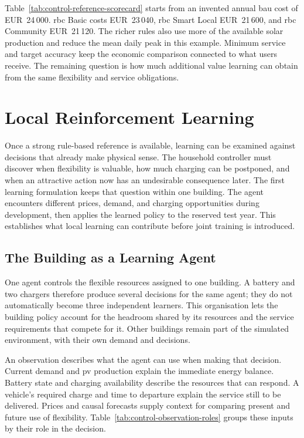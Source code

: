 

\illustrativereading Table~\ref{tab:control-reference-scorecard} starts from an invented annual \gls{bau} cost of EUR~24\,000. \gls{rbc} Basic costs EUR~23\,040, \gls{rbc} Smart Local EUR~21\,600, and \gls{rbc} Community EUR~21\,120. The richer rules also use more of the available solar production and reduce the mean daily peak in this example. Minimum service and target accuracy keep the economic comparison connected to what users receive. The remaining question is how much additional value learning can obtain from the same flexibility and service obligations.


\section{Local Reinforcement Learning}
\label{sec:control-local-learning}
\label{sec:single-agent-learning}

Once a strong rule-based reference is available, learning can be examined against decisions that already make physical sense. The household controller must discover when flexibility is valuable, how much charging can be postponed, and when an attractive action now has an undesirable consequence later. The first learning formulation keeps that question within one building. The agent encounters different prices, demand, and charging opportunities during development, then applies the learned policy to the reserved test year. This establishes what local learning can contribute before joint training is introduced.

\subsection{The Building as a Learning Agent}

One agent controls the flexible resources assigned to one building. A battery and two chargers therefore produce several decisions for the same agent; they do not automatically become three independent learners. This organisation lets the building policy account for the headroom shared by its resources and the service requirements that compete for it. Other buildings remain part of the simulated environment, with their own demand and decisions.

An observation describes what the agent can use when making that decision. Current demand and \gls{pv} production explain the immediate energy balance. Battery state and charging availability describe the resources that can respond. A vehicle's required charge and time to departure explain the service still to be delivered. Prices and causal forecasts supply context for comparing present and future use of flexibility. Table~\ref{tab:control-observation-roles} groups these inputs by their role in the decision.

